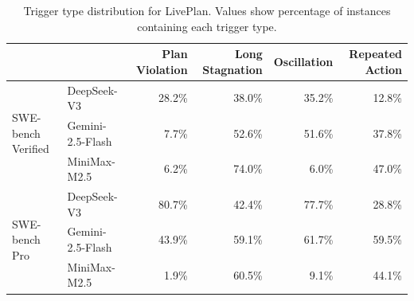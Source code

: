 \begin{table}[t]
\caption{Trigger type distribution for LivePlan. Values show percentage of instances containing each trigger type.}
\label{tab:trigger_refiner_coarse}
\centering
\scriptsize
\begin{tabular}{llrrrr}
\toprule
 & & Plan Violation & Long Stagnation & Oscillation & Repeated Action \\
\midrule
\multirow{3}{*}{SWE-bench Verified} & DeepSeek-V3 & 28.2\% & 38.0\% & 35.2\% & 12.8\% \\
 & Gemini-2.5-Flash & 7.7\% & 52.6\% & 51.6\% & 37.8\% \\
 & MiniMax-M2.5 & 6.2\% & 74.0\% & 6.0\% & 47.0\% \\
\midrule
\multirow{3}{*}{SWE-bench Pro} & DeepSeek-V3 & 80.7\% & 42.4\% & 77.7\% & 28.8\% \\
 & Gemini-2.5-Flash & 43.9\% & 59.1\% & 61.7\% & 59.5\% \\
 & MiniMax-M2.5 & 1.9\% & 60.5\% & 9.1\% & 44.1\% \\
\bottomrule
\end{tabular}
\end{table}
